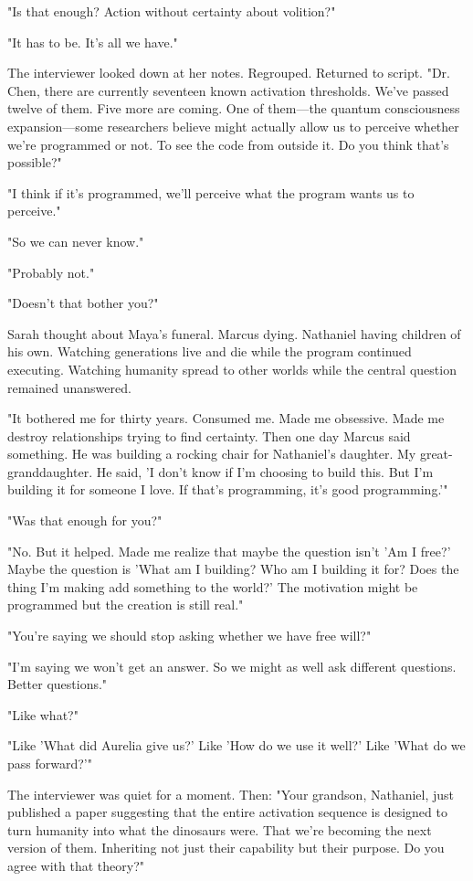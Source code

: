 "Is that enough? Action without certainty about volition?"

"It has to be. It's all we have."

The interviewer looked down at her notes. Regrouped. Returned to script. "Dr. Chen, there are currently seventeen known activation thresholds. We've passed twelve of them. Five more are coming. One of them—the quantum consciousness expansion—some researchers believe might actually allow us to perceive whether we're programmed or not. To see the code from outside it. Do you think that's possible?"

"I think if it's programmed, we'll perceive what the program wants us to perceive."

"So we can never know."

"Probably not."

"Doesn't that bother you?"

Sarah thought about Maya's funeral. Marcus dying. Nathaniel having children of his own. Watching generations live and die while the program continued executing. Watching humanity spread to other worlds while the central question remained unanswered.

"It bothered me for thirty years. Consumed me. Made me obsessive. Made me destroy relationships trying to find certainty. Then one day Marcus said something. He was building a rocking chair for Nathaniel's daughter. My great-granddaughter. He said, 'I don't know if I'm choosing to build this. But I'm building it for someone I love. If that's programming, it's good programming.'"

"Was that enough for you?"

"No. But it helped. Made me realize that maybe the question isn't 'Am I free?' Maybe the question is 'What am I building? Who am I building it for? Does the thing I'm making add something to the world?' The motivation might be programmed but the creation is still real."

"You're saying we should stop asking whether we have free will?"

"I'm saying we won't get an answer. So we might as well ask different questions. Better questions."

"Like what?"

"Like 'What did Aurelia give us?' Like 'How do we use it well?' Like 'What do we pass forward?'"

The interviewer was quiet for a moment. Then: "Your grandson, Nathaniel, just published a paper suggesting that the entire activation sequence is designed to turn humanity into what the dinosaurs were. That we're becoming the next version of them. Inheriting not just their capability but their purpose. Do you agree with that theory?"


